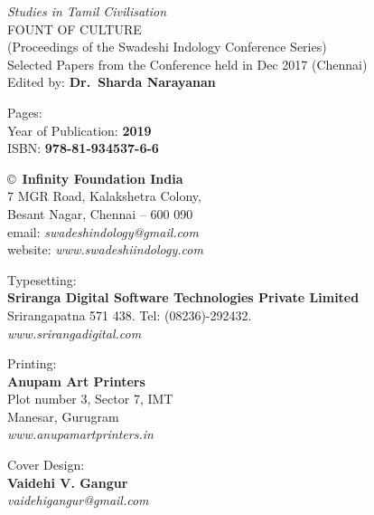 \thispagestyle{empty}

\noindent
{\fontsize{9}{11}\selectfont\sl Studies in Tamil Civilisation}\\
FOUNT OF CULTURE\\
(Proceedings of the Swadeshi Indology Conference Series)\\
Selected Papers from the Conference held in Dec 2017 (Chennai)\\
Edited by: {\bf Dr.\ Sharda Narayanan}
\vfill

\noindent
Pages: {\bf\pageref{bookend}}\\
Year of Publication: {\bf 2019}\\
ISBN: {\bf 978-81-934537-6-6}\\
\vfill

\noindent
\copyright\ {\bf Infinity Foundation India}\\ 
7 MGR Road, Kalakshetra Colony,\\ 
Besant Nagar, Chennai -- 600 090\\
email: {\sl swadeshindology@gmail.com}\\
website: {\sl www.swadeshiindology.com} 
\vfill

\noindent
Typesetting:\\ 
{\bf Sriranga Digital Software Technologies Private Limited}\\ 
Srirangapatna 571 438. Tel: (08236)-292432.\\
{\sl www.srirangadigital.com}
\vfill

\noindent
Printing:\\
{\bf Anupam Art Printers}\\
Plot number 3, Sector 7, IMT\\
Manesar, Gurugram\\
{\sl www.anupamartprinters.in}
\bigskip

\noindent
Cover Design:\\ 
{\bf Vaidehi V. Gangur}\\
{\sl vaidehigangur@gmail.com}
